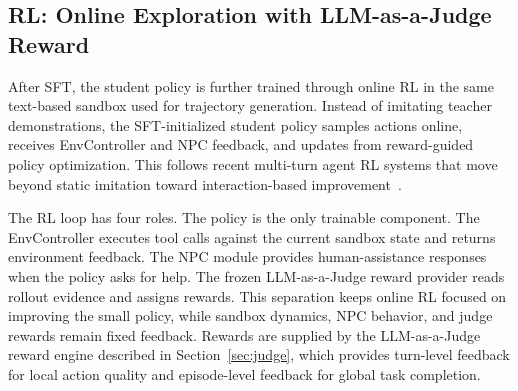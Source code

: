 \subsection{RL: Online Exploration with LLM-as-a-Judge Reward}
\label{sec:rl}



After SFT, the student policy is further trained through online RL in
the same text-based sandbox used for trajectory generation. Instead of
imitating teacher demonstrations, the SFT-initialized student policy
samples actions online, receives EnvController and NPC feedback, and
updates from reward-guided policy optimization. This follows recent
multi-turn agent RL systems that move beyond static imitation toward
interaction-based improvement~\cite{zhou2024archer,wei2025webagentr1,wang2025ragen}.



The RL loop has four roles. The policy is the only trainable component.
The EnvController executes tool calls against the current sandbox state
and returns environment feedback. The NPC module provides
human-assistance responses when the policy asks for help. The frozen
LLM-as-a-Judge reward provider reads rollout evidence and assigns
rewards. This separation keeps online RL focused on improving the small
policy, while sandbox dynamics, NPC behavior, and judge rewards remain
fixed feedback. Rewards are supplied by the LLM-as-a-Judge reward engine
described in Section~\ref{sec:judge}, which provides turn-level feedback for local
action quality and episode-level feedback for global task completion.


